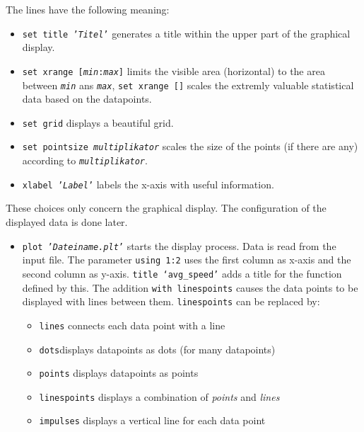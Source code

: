 The lines have the following meaning:
\begin{itemize}
\item \texttt{set title '\textit{Titel}'} generates a title within the upper part of the graphical display.
\item \texttt{set xrange [\textit{min}:\textit{max}]} limits the visible area (horizontal) to the area between \texttt{\textit{min}} ans \texttt{\textit{max}}, \texttt{set xrange []} scales the extremly valuable statistical data based on the datapoints.
\item \texttt{set grid} displays a beautiful grid.
\item \texttt{set pointsize \textit{multiplikator}} scales the size of the points (if there are any) according to \texttt{\textit{multiplikator}}.
\item \texttt{xlabel '\textit{Label}'} labels the x-axis with useful information.
\end{itemize}
These choices only concern the graphical display. The configuration of the displayed data is done later.

\begin{itemize}
 \item \texttt{plot '\textit{Dateiname.plt}'} starts the display process. Data is read from the input file. The parameter \texttt{using 1:2} uses the first column as x-axis and the second column as y-axis. \texttt{title `avg\_speed'} adds a title for the function defined by this. The addition \texttt{with linespoints} causes the data points to be displayed with lines between them. \texttt{linespoints} can be replaced by:
\begin{itemize}
\item \texttt{lines} connects each data point with a line
\item \texttt{dots}displays datapoints as dots (for many datapoints)
\item \texttt{points} displays datapoints as points
\item \texttt{linespoints} displays a combination of \textit{points} and \textit{lines}
\item \texttt{impulses} displays a vertical line for each data point
\end{itemize}

\end{itemize}

